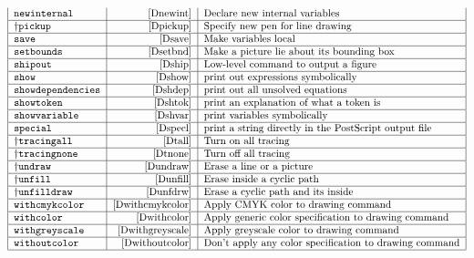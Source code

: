 \begin{table}[htp]
$$\begin{tabular}{|l|r|l|}
\tt \verb|newinternal|& \pageref{Dnewint}&
        Declare new internal variables\\\hline
\pl\tt \verb|pickup|&   \pageref{Dpickup}&
        Specify new pen for line drawing\\\hline
\tt \verb|save|&        \pageref{Dsave}&
        Make variables local\\\hline
\tt \verb|setbounds|&   \pageref{Dsetbnd}&
        Make a picture lie about its bounding box\\\hline
\tt \verb|shipout|&     \pageref{Dship}&
        Low-level command to output a figure\\\hline
\tt \verb|show|&        \pageref{Dshow}&
        print out expressions symbolically\\\hline
\tt \verb|showdependencies|&    \pageref{Dshdep}&
        print out all unsolved equations\\\hline
\tt \verb|showtoken|&   \pageref{Dshtok}&
        print an explanation of what a token is\\\hline
\tt \verb|showvariable|&        \pageref{Dshvar}&
        print variables symbolically\\\hline
\tt \verb|special|&     \pageref{Dspecl}&
        print a string directly in the PostScript output file\\\hline
\pl\tt \verb|tracingall|&       \pageref{Dtall}&
        Turn on all tracing\\\hline
\pl\tt \verb|tracingnone|&      \pageref{Dtnone}&
        Turn off all tracing\\\hline
\pl\tt \verb|undraw|&   \pageref{Dundraw}&
        Erase a line or a picture\\\hline
\pl\tt \verb|unfill|&   \pageref{Dunfill}&
        Erase inside a cyclic path\\\hline
\pl\tt \verb|unfilldraw|&       \pageref{Dunfdrw}&
        Erase a cyclic path and its inside\\\hline
\tt \verb|withcmykcolor|&    \pageref{Dwithcmykcolor}&
        Apply CMYK color to drawing command\\\hline
\tt \verb|withcolor|&        \pageref{Dwithcolor}&
        Apply generic color specification to drawing command\\\hline
\tt \verb|withgreyscale|&    \pageref{Dwithgreyscale}&
        Apply greyscale color to drawing command\\\hline
\tt \verb|withoutcolor|&     \pageref{Dwithoutcolor}&
        Don't apply any color specification to drawing command\\\hline

\end{tabular}$$
\end{table}
